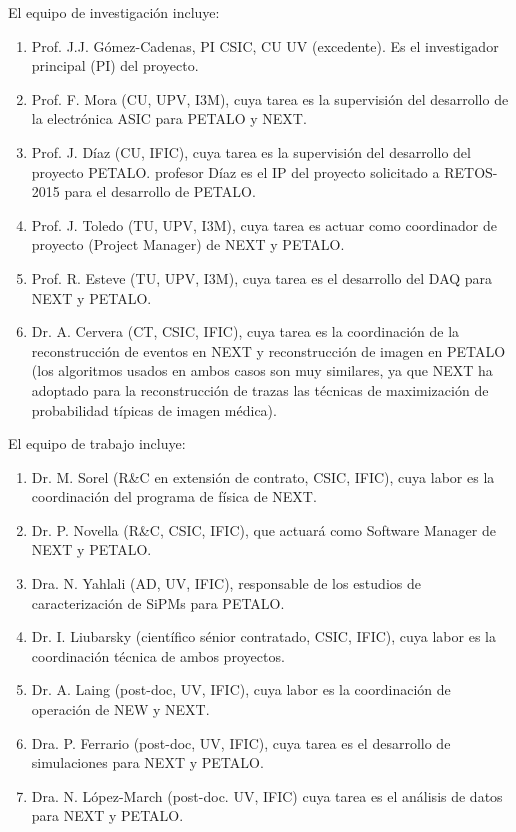 El equipo de investigación incluye: 

\begin{enumerate}
\item Prof. J.J. Gómez-Cadenas, PI CSIC, CU UV (excedente). Es el investigador principal (PI) del proyecto. 
\item Prof. F. Mora (CU, UPV, I3M), cuya tarea es la supervisión del desarrollo de la electrónica ASIC para PETALO y NEXT.
\item Prof. J. Díaz (CU, IFIC), cuya tarea es la supervisión del desarrollo del proyecto PETALO.
profesor Díaz es el IP del proyecto solicitado a RETOS-2015 para el desarrollo de PETALO. 
\item Prof. J. Toledo (TU, UPV, I3M), cuya tarea es actuar como coordinador de proyecto (Project Manager) de NEXT y PETALO.
\item Prof. R. Esteve (TU, UPV, I3M), cuya tarea es el desarrollo del DAQ para NEXT y PETALO.
\item Dr. A. Cervera (CT, CSIC, IFIC), cuya tarea es la coordinación de la reconstrucción de eventos en NEXT y reconstrucción de imagen en PETALO (los algoritmos usados en ambos casos son muy similares, ya que NEXT ha adoptado para la reconstrucción de trazas las técnicas de maximización de probabilidad típicas de imagen médica).
\end{enumerate}

El equipo de trabajo incluye:
\begin{enumerate}
\item Dr. M. Sorel (R\&C en extensión de contrato, CSIC, IFIC), cuya labor es la coordinación del programa de física de NEXT.
\item Dr. P. Novella (R\&C, CSIC, IFIC), que actuará como Software Manager de NEXT y PETALO.
\item Dra. N. Yahlali (AD, UV, IFIC), responsable de los estudios de caracterización de SiPMs para PETALO. 
\item Dr. I. Liubarsky (científico sénior contratado, CSIC, IFIC), cuya labor es la coordinación técnica de ambos proyectos.
\item Dr. A. Laing (post-doc, UV, IFIC), cuya labor es la coordinación de operación de NEW y NEXT.
\item Dra. P. Ferrario (post-doc, UV, IFIC), cuya tarea es el desarrollo de simulaciones para NEXT y PETALO. 
\item Dra. N. López-March (post-doc. UV, IFIC) cuya tarea es el análisis de datos para NEXT y PETALO.
\end{enumerate}

